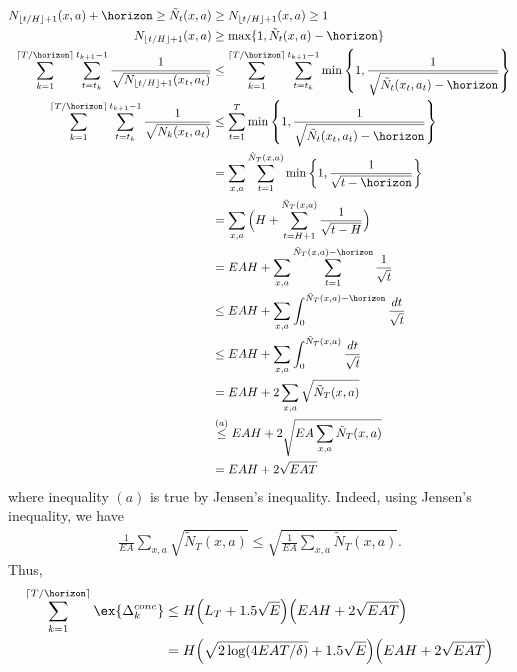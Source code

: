         \begin{align*}
            N_{\lfloor t/H\rfloor+1}(x,a) +\horizon \ge \tilde{N}_t(x,a) &\ge N_{\lfloor t/H\rfloor+1}(x,a) \ge 1 \\
            N_{\lfloor t/H\rfloor+1}(x,a) &\ge \max\{1, \tilde{N}_t(x,a) -\horizon\} \\
            \sum_{k=1}^{\lceil T/\horizon\rceil} \sum_{t=t_k}^{t_{k+1}-1} \frac{1}{\sqrt{N_{\lfloor t/H\rfloor+1}(x_t,a_t)}} &\le \sum_{k=1}^{\lceil T/\horizon\rceil} \sum_{t=t_k}^{t_{k+1}-1} \min\left\{1, \frac{1}{\sqrt{\tilde{N}_t(x_t,a_t) -\horizon}}\right\} \\
            \sum_{k=1}^{\lceil T/\horizon\rceil} \sum_{t=t_k}^{t_{k+1}-1} \frac{1}{\sqrt{N_k(x_t,a_t)}} &\le \sum_{t=1}^{T} \min\left\{1, \frac{1}{\sqrt{\tilde{N}_t(x_t,a_t) -\horizon}}\right\} \\
            &= \sum_{x,a} \sum_{t=1}^{\tilde{N}_T(x,a)} \min\left\{1, \frac{1}{\sqrt{t -\horizon}}\right\} \\
            &= \sum_{x,a} \Big(H +\sum_{t=H+1}^{\tilde{N}_T(x,a)} \frac{1}{\sqrt{t -H}}\Big) \\
            &= EAH +\sum_{x,a} \sum_{t=1}^{\tilde{N}_T(x,a) -\horizon} \frac{1}{\sqrt{t}} \\
            &\le EAH +\sum_{x,a} \int_0^{\tilde{N}_T(x,a) -\horizon} \frac{dt}{\sqrt{t}} \\
            &\le EAH +\sum_{x,a} \int_0^{\tilde{N}_T(x,a)} \frac{dt}{\sqrt{t}} \\
            &= EAH +2\sum_{x,a} \sqrt{\tilde{N}_T(x,a)} \\
            &\overset{(a)}\le EAH +2\sqrt{EA \sum_{x,a}\tilde{N}_T(x,a)} \\
            &= EAH +2\sqrt{EAT}
        \end{align*}
        where inequality $(a)$ is true by Jensen's inequality. Indeed, using Jensen's inequality, we have
        \begin{align*}
            \frac{1}{EA}\sum_{x,a}\sqrt{\tilde{N}_T(x,a)} \le\sqrt{\frac{1}{EA}\sum_{x,a}\tilde{N}_T(x,a)}.
        \end{align*}
        Thus,
        \begin{align*}
            \sum_{k=1}^{\lceil T/\horizon\rceil}\ex{\Delta_k^{conc}}
            &\le H\Big(L_T+1.5\sqrt{E}\Big) \Big(EAH +2\sqrt{EAT}\Big) \\
            &= H\Big(\sqrt{2\log(4EAT/\delta)} +1.5\sqrt{E}\Big) \Big(EAH +2\sqrt{EAT}\Big)
        \end{align*}
